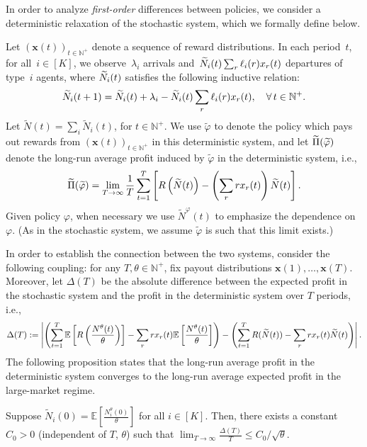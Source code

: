 \documentclass[12pt]{article}
\begin{document}
In order to analyze {\it first-order} {differences between policies}, we consider a deterministic relaxation of the stochastic system, which we formally define below.


Let $(\mathbf{x}(t))_{t \in \mathbb{N}^+}$ denote a sequence of reward distributions. In each period~$t$, for all~$i \in [K]$, we observe~$\lambda_i$ arrivals and~$\widetilde{N}_i(t)\sum_r \ell_i(r)x_r(t)$ departures of type~$i$ agents, where $\widetilde{N}_i(t)$ satisfies the following inductive relation:
\begin{align}\label{eq:inductive-deterministic}
    \widetilde{N}_i(t+1) = \widetilde{N}_i(t) + \lambda_i - \widetilde{N}_i(t)\sum_r\ell_i(r)x_r(t), \quad \forall\, t \in \mathbb{N}^+.
\end{align}
Let $\widetilde{N}(t) = \sum_i \widetilde{N}_i(t)$, for $t \in \mathbb{N}^+$. We use $\widetilde{\varphi}$ to denote the policy which pays out rewards from $(\mathbf{x}(t))_{t \in \mathbb{N}^+}$ in this deterministic system, and let $\widetilde{\Pi}(\widetilde{\varphi})$ denote the long-run average profit induced by $\widetilde{\varphi}$ in the deterministic system, i.e.,
\begin{align}
    \widetilde{\Pi}(\widetilde{\varphi}) = \lim_{T\to\infty}\frac1T \sum_{t=1}^T \left[R\left(\widetilde{N}(t)\right) - \left(\sum_r r x_r(t)\right)\widetilde{N}(t)\right].
\end{align}
Given policy $\varphi$, when necessary we use $\widetilde{N}^\varphi(t)$ to emphasize the dependence on $\varphi$. (As in the stochastic system, we assume $\widetilde{\varphi}$ is such that this limit exists.)


In order to establish the connection between the two systems, consider the following coupling: for any $T, \theta \in \mathbb{N}^+$, fix payout distributions $\mathbf{x}(1),\ldots,\mathbf{x}(T)$. Moreover, let $\Delta(T)$ be the absolute difference between the expected profit in the stochastic system and the profit in the deterministic system over $T$ periods, i.e.,
$$\Delta(T) := \left\lvert\left(\sum_{t=1}^T\mathbb{E}\left[R\left(\frac{N^\theta(t)}{\theta}\right)\right] -\sum_r rx_r(t)\mathbb{E}\left[\frac{N^\theta(t)}{\theta}\right]\right)-\left(\sum_{t=1}^T R(\widetilde{N}(t))-\sum_r rx_r(t)\widetilde{N}(t)\right)\right\rvert.$$ The following proposition states that the long-run average profit in the deterministic system converges to the long-run average expected profit in the large-market regime.


\begin{proposition}\label{prop:det-to-stoch}
Suppose $\widetilde{N}_i(0) = \mathbb{E}\left[\frac{N_i^\theta(0)}{\theta}\right]$ for all $i \in [K]$. Then, there exists a constant $C_0 > 0$ (independent of $T$, $\theta$) such that $\lim_{T\to\infty}\frac{\Delta(T)}{T} \leq C_0/\sqrt{\theta}$.
\end{proposition}
\end{document}
